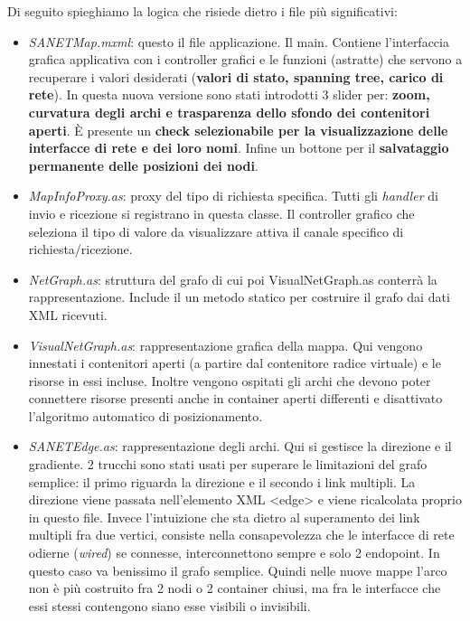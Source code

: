 \documentclass[a4wide,10pt,italian]{manual}
\begin{document}
Di seguito spieghiamo la logica che risiede dietro i file più significativi:
\begin{itemize}
\item {} 
\emph{SANETMap.mxml}: questo il file applicazione. Il main.
Contiene l'interfaccia grafica applicativa con i controller grafici e le funzioni (astratte) che servono a recuperare i valori desiderati (\textbf{valori di stato, spanning tree, carico di rete}). In questa nuova versione
sono stati introdotti 3 slider per: \textbf{zoom, curvatura degli archi e trasparenza dello sfondo dei contenitori aperti}.
È presente un \textbf{check selezionabile per la visualizzazione delle interfacce di rete e dei loro nomi}.
Infine un bottone per il \textbf{salvataggio permanente delle posizioni dei nodi}.

\item {} 
\emph{MapInfoProxy.as}: proxy del tipo di richiesta specifica. Tutti gli \emph{handler} di invio e ricezione si registrano in questa classe. Il controller
grafico che seleziona il tipo di valore da visualizzare attiva il canale specifico di richiesta/ricezione.

\item {} 
\emph{NetGraph.as}: struttura del grafo di cui poi VisualNetGraph.as conterrà la rappresentazione. Include il un metodo statico per costruire il grafo dai dati XML ricevuti.

\item {} 
\emph{VisualNetGraph.as}: rappresentazione grafica della mappa. Qui vengono innestati i contenitori aperti (a partire dal contenitore radice virtuale) e le risorse in essi incluse. Inoltre vengono ospitati gli archi che devono poter connettere risorse presenti anche in container aperti differenti e disattivato l'algoritmo automatico di posizionamento.

\item {} 
\emph{SANETEdge.as}: rappresentazione degli archi. Qui si gestisce la direzione e il gradiente. 2 trucchi sono stati usati per superare le limitazioni del grafo semplice: il primo riguarda la direzione e il secondo i link multipli. La direzione viene passata nell'elemento XML \textless{}edge\textgreater{} e viene ricalcolata proprio in questo file. Invece l'intuizione che sta dietro al superamento dei link multipli fra due vertici, consiste nella consapevolezza che le interfacce di rete odierne (\emph{wired}) se connesse, interconnettono sempre e solo 2 endopoint. In questo caso va benissimo il grafo semplice. Quindi nelle nuove mappe l'arco non è più costruito fra 2 nodi o 2 container chiusi, ma fra le interfacce che essi stessi contengono siano esse visibili o invisibili.


\end{itemize}
\end{document}
